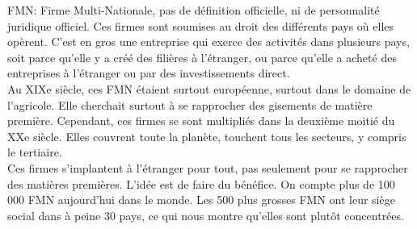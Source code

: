 \documentclass[10pt, a4paper, openany]{book}
\begin{document}
FMN: Firme Multi-Nationale, pas de définition officielle, ni de personnalité juridique officiel. Ces firmes sont soumises au droit des différents pays où elles opèrent. C'est en gros une entreprise qui exerce des activités dans plusieurs pays, soit parce qu'elle y a créé des filières à l'étranger, ou parce qu'elle a acheté des entreprises à l'étranger ou par des investissements direct. \\
Au XIXe siècle, ces FMN étaient surtout européenne, surtout dans le domaine de l'agricole. Elle cherchait surtout à se rapprocher des gisements de matière première. Cependant, ces firmes se sont multipliés dans la deuxième moitié du XXe siècle. Elles couvrent toute la planète, touchent tous les secteurs, y compris le tertiaire. \\
Ces firmes s'implantent à l'étranger pour tout, pas seulement pour se rapprocher des matières premières. L'idée est de faire du bénéfice. On compte plus de 100 000 FMN aujourd'hui dans le monde. Les 500 plus grosses FMN ont leur siège social dans à peine 30 pays, ce qui nous montre qu'elles sont plutôt concentrées. 
\end{document}
